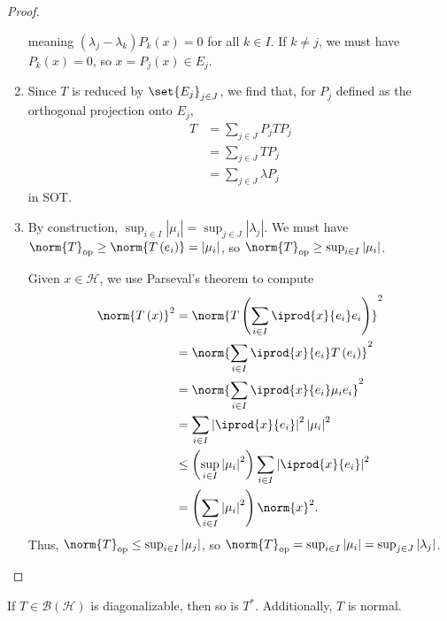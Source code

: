\documentclass[10pt]{mypackage}
\begin{document}
\begin{proof}
\begin{enumerate}[(1)]
      meaning $\left(\lambda_j - \lambda_k\right)P_k\left(x\right) = 0$ for all $k\in I$. If $k\neq j$, we must have $P_k\left(x\right) = 0$, so $x = P_j\left(x\right) \in E_j$.
    \item Since $T$ is reduced by $\set{E_j}_{j\in J}$, we find that, for $P_j$ defined as the orthogonal projection onto $E_j$,
      \begin{align*}
        T &= \sum_{j\in J}P_jTP_j\\
          &= \sum_{j\in J}TP_j\\
          &= \sum_{j\in J}\lambda P_j
      \end{align*}
      in SOT.
    \item By construction, $\sup_{i\in I}\left\vert \mu_i \right\vert = \sup_{j\in J}\left\vert \lambda_j \right\vert$. We must have $\norm{T}_{\text{op}} \geq \norm{T\left(e_i\right)} = \left\vert \mu_i \right\vert$, so $\norm{T}_{\text{op}} \geq \sup_{i\in I}\left\vert \mu_i \right\vert$.\newline

      Given $x\in \mathcal{H}$, we use Parseval's theorem to compute
      \begin{align*}
        \norm{T\left(x\right)}^2 &= \norm{T\left(\sum_{i\in I} \iprod{x}{e_i}e_i\right)}^2\\
                                 &= \norm{\sum_{i\in I} \iprod{x}{e_i}T\left(e_i\right)}^2\\
                                 &= \norm{\sum_{i\in I} \iprod{x}{e_i}\mu_ie_i}^2\\
                                 &= \sum_{i\in I}\left\vert \iprod{x}{e_i} \right\vert^2 \left\vert \mu_i \right\vert^2\\
                                 &\leq \left(\sup_{i\in I}\left\vert \mu_i \right\vert^2\right)\sum_{i\in I} \left\vert \iprod{x}{e_i} \right\vert^2\\
                                 &= \left(\sum_{i\in I}\left\vert \mu_i \right\vert^2\right)\norm{x}^2.
      \end{align*}
      Thus, $\norm{T}_{\text{op}} \leq \sup_{i\in I}\left\vert \mu_j \right\vert$, so $\norm{T}_{\text{op}} = \sup_{i\in I}\left\vert \mu_i \right\vert = \sup_{j\in J}\left\vert \lambda_j \right\vert$.
  \end{enumerate}
\end{proof}
\begin{corollary}
  If $T\in \mathcal{B}\left(\mathcal{H}\right)$ is diagonalizable, then so is $T^{\ast}$. Additionally, $T$ is normal.
\end{corollary}
\end{document}
